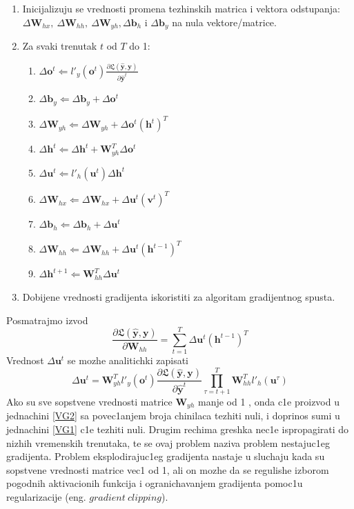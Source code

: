 \documentclass[a4paper, openany, oneside, 11pt]{book}
\begin{document}
\begin{enumerate}
\item Inicijalizuju se vrednosti promena tezhinskih matrica i vektora odstupanja: $\Delta\mathbf{W}_{hx},\ \Delta\mathbf{W}_{hh},\ \Delta\mathbf{W}_{yh}, \Delta\mathbf{b}_h$  i $\Delta\mathbf{b}_y$ na nula vektore/matrice.
\item Za svaki trenutak $t$ od $T$ do 1:
\begin{enumerate}
\item  $\Delta\mathbf{o}^t \Leftarrow l'_y(\mathbf{o}^t)\frac{\partial\mathfrak{L}(\mathbf{\hat{y}},\mathbf{y})}{\partial\mathbf{\hat{y}}^t}$
\item $\Delta\mathbf{b}_y \Leftarrow \Delta\mathbf{b}_y+\Delta\mathbf{o}^t$
\item $\Delta\mathbf{W}_{yh} \Leftarrow \Delta\mathbf{W}_{yh}+\Delta\mathbf{o}^t(\mathbf{h}^t)^T$
\item $\Delta\mathbf{h}^t \Leftarrow \Delta\mathbf{h}^t+\mathbf{W}_{yh}^T\Delta\mathbf{o}^t$
\item $\Delta\mathbf{u}^t \Leftarrow l'_h(\mathbf{u}^t)\Delta\mathbf{h}^t$
\item $\Delta\mathbf{W}_{hx} \Leftarrow \Delta\mathbf{W}_{hx}+\Delta\mathbf{u}^t(\mathbf{v}^t)^T$
\item $\Delta\mathbf{b}_h \Leftarrow \Delta\mathbf{b}_h + \Delta\mathbf{u}^t$
\item $\Delta\mathbf{W}_{hh} \Leftarrow \Delta\mathbf{W}_{hh}+\Delta\mathbf{u}^t(\mathbf{h}^{t-1})^T$
\item $\Delta\mathbf{h}^{t+1} \Leftarrow \mathbf{W}_{hh}^T\Delta\mathbf{u}^t  $
\end{enumerate}
\item Dobijene vrednosti gradijenta iskoristiti za algoritam gradijentnog spusta.
\end{enumerate}
Posmatrajmo izvod
\begin{equation}\label{VG1}
\frac{\partial\mathfrak{L}(\mathbf{\hat{y}},\mathbf{y})}{\partial \mathbf{W}_{hh}} = \sum^{T}_{t=1}\Delta\mathbf{u}^t(\mathbf{h}^{t-1})^T
\end{equation}
Vrednost $\Delta\mathbf{u}^t $ se mozhe analitichki zapisati
\begin{equation}\label{VG2}
\Delta\mathbf{u}^t = \mathbf{W}_{yh}^T l'_y(\mathbf{o}^t)\frac{\partial\mathfrak{L}(\mathbf{\hat{y}},\mathbf{y})}{\partial\mathbf{\hat{y}}^t}\prod^T_{\tau=t+1}\mathbf{W}_{hh}^Tl'_h(\mathbf{u}^{\tau})
\end{equation}
Ako su sve sopstvene vrednosti matrice $\mathbf{W}_{yh}$ manje od 1 , onda c1e proizvod u jednachini \ref{VG2} sa povec1anjem broja chinilaca tezhiti nuli, i doprinos sumi u jednachini \ref{VG1} c1e tezhiti nuli. Drugim rechima greshka nec1e ispropagirati do nizhih vremenskih trenutaka, te se ovaj problem naziva problem nestajuc1eg gradijenta. Problem eksplodirajuc1eg gradijenta nastaje u sluchaju kada su sopstvene vrednosti matrice vec1 od 1, ali on mozhe da se regulishe izborom pogodnih aktivacionih funkcija i ogranichavanjem gradijenta pomoc1u regularizacije (eng. $gradient\ clipping$).\\
\end{document}
